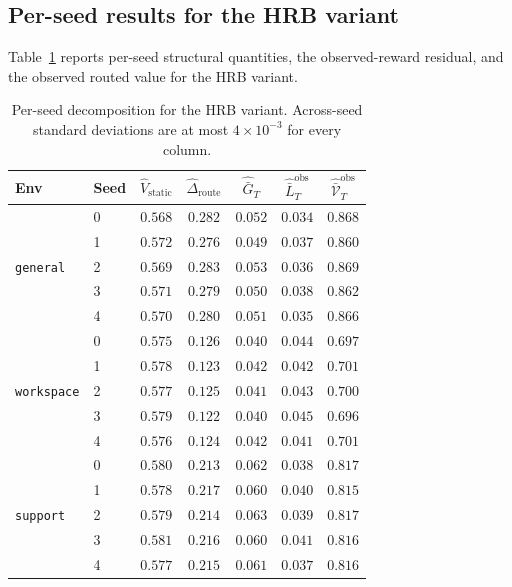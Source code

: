 \documentclass{article} %
\begin{document}
\subsection{Per-seed results for the \textnormal{HRB} variant}

\label{app:tab-perseed}

Table~\ref{tab:app-perseed} reports per-seed structural quantities, the
observed-reward residual, and the observed routed value for the
\textnormal{HRB} variant.

\begin{table}[h]
\centering
\small
\setlength{\tabcolsep}{4pt}
\begin{tabular}{llccccc}
\toprule
Env & Seed & $\widehat V_{\mathrm{static}}$ & $\widehat\Delta_{\mathrm{route}}$ & $\widehat{\bar G}_T$ & $\widehat{\bar L}_T^{\mathrm{obs}}$ & $\widehat{\bar{\mathcal V}}_T^{\mathrm{obs}}$ \\
\midrule
\multirow{5}{*}{\texttt{general}}
 & 0 & $0.568$ & $0.282$ & $0.052$ & $0.034$ & $0.868$ \\
 & 1 & $0.572$ & $0.276$ & $0.049$ & $0.037$ & $0.860$ \\
 & 2 & $0.569$ & $0.283$ & $0.053$ & $0.036$ & $0.869$ \\
 & 3 & $0.571$ & $0.279$ & $0.050$ & $0.038$ & $0.862$ \\
 & 4 & $0.570$ & $0.280$ & $0.051$ & $0.035$ & $0.866$ \\
\midrule
\multirow{5}{*}{\texttt{workspace}}
 & 0 & $0.575$ & $0.126$ & $0.040$ & $0.044$ & $0.697$ \\
 & 1 & $0.578$ & $0.123$ & $0.042$ & $0.042$ & $0.701$ \\
 & 2 & $0.577$ & $0.125$ & $0.041$ & $0.043$ & $0.700$ \\
 & 3 & $0.579$ & $0.122$ & $0.040$ & $0.045$ & $0.696$ \\
 & 4 & $0.576$ & $0.124$ & $0.042$ & $0.041$ & $0.701$ \\
\midrule
\multirow{5}{*}{\texttt{support}}
 & 0 & $0.580$ & $0.213$ & $0.062$ & $0.038$ & $0.817$ \\
 & 1 & $0.578$ & $0.217$ & $0.060$ & $0.040$ & $0.815$ \\
 & 2 & $0.579$ & $0.214$ & $0.063$ & $0.039$ & $0.817$ \\
 & 3 & $0.581$ & $0.216$ & $0.060$ & $0.041$ & $0.816$ \\
 & 4 & $0.577$ & $0.215$ & $0.061$ & $0.037$ & $0.816$ \\
\bottomrule
\end{tabular}
\caption{Per-seed decomposition for the \textnormal{HRB} variant. Across-seed standard deviations are at most $4\times 10^{-3}$ for every column.}
\label{tab:app-perseed}
\end{table}
\end{document}
